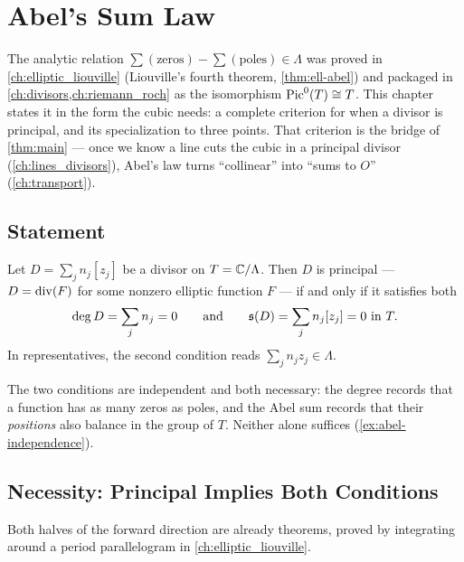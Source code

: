\chapter{Abel's Sum Law}
\label{ch:abel}

The analytic relation \(\sum(\text{zeros}) - \sum(\text{poles}) \in \Lambda\) was
proved in \cref{ch:elliptic_liouville} (Liouville's fourth theorem,
\cref{thm:ell-abel}) and packaged in \cref{ch:divisors,ch:riemann_roch} as the
isomorphism \(\operatorname{Pic}^0(T) \cong T\). This chapter states it in the form the cubic
needs: a complete criterion for when a divisor is principal, and its
specialization to three points. That criterion is the bridge of \cref{thm:main} ---
once we know a line cuts the cubic in a principal divisor (\cref{ch:lines_divisors}),
Abel's law turns ``collinear'' into ``sums to \(O\)'' (\cref{ch:transport}).

\section{Statement}
\label{sec:abel-statement}

\begin{theorem}
\label{thm:abel-law}
Let \(D = \sum_j n_j [z_j]\) be a divisor on \(T = \mathbb{C}/\Lambda\). Then \(D\) is
principal --- \(D = \operatorname{div}(F)\) for some nonzero elliptic function \(F\) --- if and
only if it satisfies both
\[
  \deg D = \sum_j n_j = 0
  \qquad\text{and}\qquad
  \mathfrak{s}(D) = \sum_j n_j [z_j] = 0 \ \text{in } T .
\]
In representatives, the second condition reads \(\sum_j n_j z_j \in \Lambda\).
\end{theorem}

The two conditions are independent and both necessary: the degree records that a
function has as many zeros as poles, and the Abel sum records that their
\emph{positions} also balance in the group of \(T\). Neither alone suffices
(\cref{ex:abel-independence}).

\section{Necessity: Principal Implies Both Conditions}
\label{sec:abel-necessity}

Both halves of the forward direction are already theorems, proved by integrating
around a period parallelogram in \cref{ch:elliptic_liouville}.

